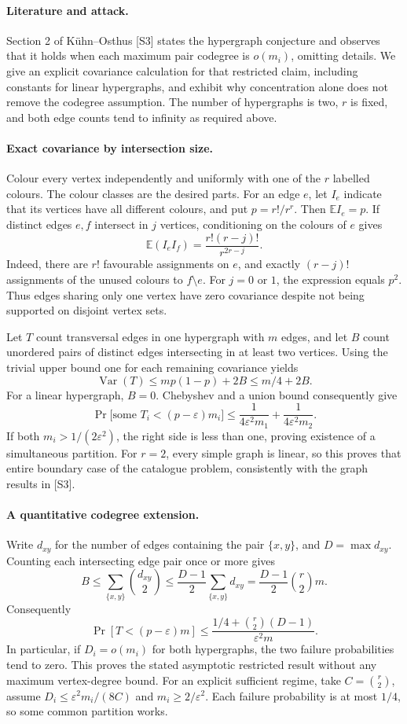 \documentclass[11pt,a4paper]{article}
\begin{document}
\paragraph{Literature and attack.}
Section 2 of Kühn--Osthus [S3] states the hypergraph conjecture and observes that it holds when each maximum pair codegree is $o(m_i)$, omitting details. We give an explicit covariance calculation for that restricted claim, including constants for linear hypergraphs, and exhibit why concentration alone does not remove the codegree assumption. The number of hypergraphs is two, $r$ is fixed, and both edge counts tend to infinity as required above.

\paragraph{Exact covariance by intersection size.}
Colour every vertex independently and uniformly with one of the $r$ labelled colours. The colour classes are the desired parts. For an edge $e$, let $I_e$ indicate that its vertices have all different colours, and put $p=r!/r^r$. Then $\mathbb E I_e=p$. If distinct edges $e,f$ intersect in $j$ vertices, conditioning on the colours of $e$ gives
\[
 \mathbb E(I_eI_f)=\frac{r!(r-j)!}{r^{2r-j}}.
\]
Indeed, there are $r!$ favourable assignments on $e$, and exactly $(r-j)!$ assignments of the unused colours to $f\setminus e$. For $j=0$ or $1$, the expression equals $p^2$. Thus edges sharing only one vertex have zero covariance despite not being supported on disjoint vertex sets.

Let $T$ count transversal edges in one hypergraph with $m$ edges, and let $B$ count unordered pairs of distinct edges intersecting in at least two vertices. Using the trivial upper bound one for each remaining covariance yields
\[
 \operatorname{Var}(T)\le mp(1-p)+2B\le m/4+2B.
\]
For a linear hypergraph, $B=0$. Chebyshev and a union bound consequently give
\[
 \Pr\bigl[\text{some }T_i<(p-\varepsilon)m_i\bigr]
 \le\frac{1}{4\varepsilon^2m_1}+\frac{1}{4\varepsilon^2m_2}.
\]
If both $m_i>1/(2\varepsilon^2)$, the right side is less than one, proving existence of a simultaneous partition. For $r=2$, every simple graph is linear, so this proves that entire boundary case of the catalogue problem, consistently with the graph results in [S3].

\paragraph{A quantitative codegree extension.}
Write $d_{xy}$ for the number of edges containing the pair $\{x,y\}$, and $D=\max d_{xy}$. Counting each intersecting edge pair once or more gives
\[
 B\le\sum_{\{x,y\}}\binom{d_{xy}}2
 \le\frac{D-1}{2}\sum_{\{x,y\}}d_{xy}
 =\frac{D-1}{2}\binom r2m.
\]
Consequently
\[
 \Pr[T<(p-\varepsilon)m]
 \le\frac{1/4+\binom r2(D-1)}{\varepsilon^2m}.
\]
In particular, if $D_i=o(m_i)$ for both hypergraphs, the two failure probabilities tend to zero. This proves the stated asymptotic restricted result without any maximum vertex-degree bound. For an explicit sufficient regime, take $C=\binom r2$, assume $D_i\le\varepsilon^2m_i/(8C)$ and $m_i\ge2/\varepsilon^2$. Each failure probability is at most $1/4$, so some common partition works.
\end{document}
